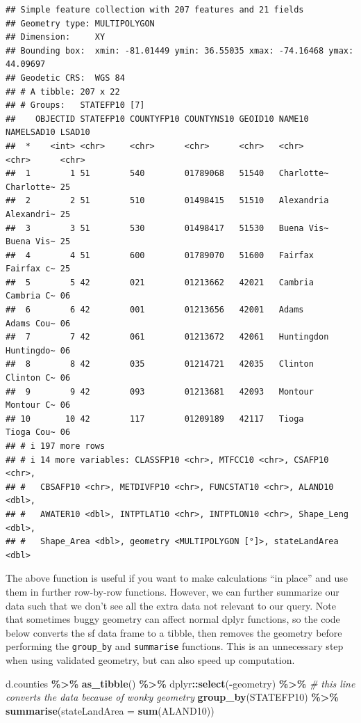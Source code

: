 \documentclass[]{article}
\newenvironment{Shaded}{\begin{snugshade}}{\end{snugshade}}
\newcommand{\AttributeTok}[1]{\textcolor[rgb]{0.13,0.29,0.53}{#1}}
\newcommand{\CommentTok}[1]{\textcolor[rgb]{0.56,0.35,0.01}{\textit{#1}}}
\newcommand{\FunctionTok}[1]{\textcolor[rgb]{0.13,0.29,0.53}{\textbf{#1}}}
\newcommand{\NormalTok}[1]{#1}
\newcommand{\SpecialCharTok}[1]{\textcolor[rgb]{0.81,0.36,0.00}{\textbf{#1}}}
\begin{document}
\begin{verbatim}
## Simple feature collection with 207 features and 21 fields
## Geometry type: MULTIPOLYGON
## Dimension:     XY
## Bounding box:  xmin: -81.01449 ymin: 36.55035 xmax: -74.16468 ymax: 44.09697
## Geodetic CRS:  WGS 84
## # A tibble: 207 x 22
## # Groups:   STATEFP10 [7]
##    OBJECTID STATEFP10 COUNTYFP10 COUNTYNS10 GEOID10 NAME10     NAMELSAD10 LSAD10
##  *    <int> <chr>     <chr>      <chr>      <chr>   <chr>      <chr>      <chr> 
##  1        1 51        540        01789068   51540   Charlotte~ Charlotte~ 25    
##  2        2 51        510        01498415   51510   Alexandria Alexandri~ 25    
##  3        3 51        530        01498417   51530   Buena Vis~ Buena Vis~ 25    
##  4        4 51        600        01789070   51600   Fairfax    Fairfax c~ 25    
##  5        5 42        021        01213662   42021   Cambria    Cambria C~ 06    
##  6        6 42        001        01213656   42001   Adams      Adams Cou~ 06    
##  7        7 42        061        01213672   42061   Huntingdon Huntingdo~ 06    
##  8        8 42        035        01214721   42035   Clinton    Clinton C~ 06    
##  9        9 42        093        01213681   42093   Montour    Montour C~ 06    
## 10       10 42        117        01209189   42117   Tioga      Tioga Cou~ 06    
## # i 197 more rows
## # i 14 more variables: CLASSFP10 <chr>, MTFCC10 <chr>, CSAFP10 <chr>,
## #   CBSAFP10 <chr>, METDIVFP10 <chr>, FUNCSTAT10 <chr>, ALAND10 <dbl>,
## #   AWATER10 <dbl>, INTPTLAT10 <chr>, INTPTLON10 <chr>, Shape_Leng <dbl>,
## #   Shape_Area <dbl>, geometry <MULTIPOLYGON [°]>, stateLandArea <dbl>
\end{verbatim}

The above function is useful if you want to make calculations ``in
place'' and use them in further row-by-row functions. However, we can
further summarize our data such that we don't see all the extra data not
relevant to our query. Note that sometimes buggy geometry can affect
normal dplyr functions, so the code below converts the sf data frame to
a tibble, then removes the geometry before performing the
\texttt{group\_by} and \texttt{summarise} functions. This is an
unnecessary step when using validated geometry, but can also speed up
computation.

\begin{Shaded}
\begin{Highlighting}[]
\NormalTok{d.counties }\SpecialCharTok{\%\textgreater{}\%} 
  \FunctionTok{as\_tibble}\NormalTok{() }\SpecialCharTok{\%\textgreater{}\%}\NormalTok{ dplyr}\SpecialCharTok{::}\FunctionTok{select}\NormalTok{(}\SpecialCharTok{{-}}\NormalTok{geometry) }\SpecialCharTok{\%\textgreater{}\%} \CommentTok{\# this line converts the data because of wonky geometry}
  \FunctionTok{group\_by}\NormalTok{(STATEFP10) }\SpecialCharTok{\%\textgreater{}\%} 
  \FunctionTok{summarise}\NormalTok{(}\AttributeTok{stateLandArea =} \FunctionTok{sum}\NormalTok{(ALAND10))}
\end{Highlighting}
\end{Shaded}
\end{document}
